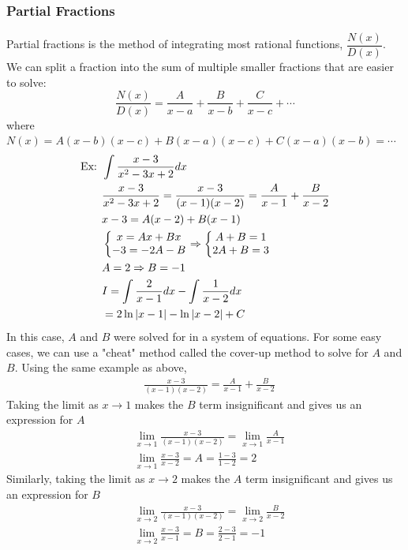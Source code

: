 \documentclass[11pt, fleqn]{article}
\begin{document}
\subsubsection{Partial Fractions}
Partial fractions is the method of integrating most rational functions, $\dfrac{N(x)}{D(x)}$.\\
We can split a fraction into the sum of multiple smaller fractions that are easier to solve:
$$\frac{N(x)}{D(x)}=\frac{A}{x-a}+\frac{B}{x-b}+\frac{C}{x-c}+\cdots$$
where $N(x)=A(x-b)(x-c)+B(x-a)(x-c)+C(x-a)(x-b)=\cdots$
\begin{align*}
    \text{Ex: }&\int\frac{x-3}{x^2-3x+2}dx\\
    &\frac{x-3}{x^2-3x+2}=\frac{x-3}{(x-1)(x-2)}=\frac{A}{x-1}+\frac{B}{x-2}\\
    &x-3=A(x-2)+B(x-1)\\
    &\left\{\begin{matrix} x=Ax+Bx\\
    -3=-2A-B
    \end{matrix}\right.\Rightarrow \left\{\begin{matrix} A+B=1\\
    2A+B=3
    \end{matrix}\right.\\
    &A=2\Rightarrow B=-1\\
    &I=\int\frac{2}{x-1}dx-\int\frac{1}{x-2}dx\\
    &=2\ln|x-1|-\ln|x-2|+C
\end{align*}
In this case, $A$ and $B$ were solved for in a system of equations. For some easy cases, we can use a "cheat" method called the cover-up method to solve for $A$ and $B$. Using the same example as above,
\begin{align*}
    &\frac{x-3}{(x-1)(x-2)}=\frac{A}{x-1}+\frac{B}{x-2}
\end{align*}
Taking the limit as $x\to 1$ makes the $B$ term insignificant and gives us an expression for $A$
\begin{align*}
    &\lim_{x\to 1}\frac{x-3}{(x-1)(x-2)}=\lim_{x\to 1}\frac{A}{x-1}\\
    &\lim_{x\to1}\frac{x-3}{x-2}=A=\frac{1-3}{1-2}=2
\end{align*}
Similarly, taking the limit as $x\to 2$ makes the $A$ term insignificant and gives us an expression for $B$
\begin{align*}
    &\lim_{x\to 2}\frac{x-3}{(x-1)(x-2)}=\lim_{x\to 2}\frac{B}{x-2}\\
    &\lim_{x\to2}\frac{x-3}{x-1}=B=\frac{2-3}{2-1}=-1
\end{align*}
\end{document}
